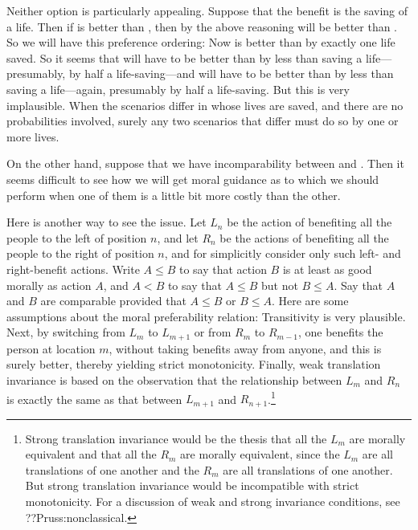 Neither option is particularly appealing. Suppose that the benefit is the saving of a life. Then if
 is better than , then by the above reasoning 
will be better than . So we will have this preference ordering:
Now  is better than  by exactly one life saved. So it seems that
 will have to be better than  by less than saving a life---presumably,
by half a life-saving---and  will have to be better than  by less than saving 
a life---again, presumably by half a life-saving. But this is very implausible. When the scenarios differ in 
whose lives are saved, and there are no probabilities involved, surely any two scenarios that differ must do 
so by one or more lives. 

On the other hand, suppose that we have incomparability between  and .
Then it seems difficult to see how we will get moral guidance as to which we should perform when one of them
is a little bit more costly than the other. 

Here is another way to see the issue. Let $L_n$ be the action of benefiting all the people to the left of 
position $n$, and let $R_n$ be the actions of benefiting all the people to the right of position $n$, and 
for simplicitly consider only such left- and right-benefit actions. Write $A\le B$ to say that action $B$ 
is at least as good morally as action $A$, and $A<B$ to say that $A\le B$ but not $B\le A$. Say that $A$ and 
$B$ are comparable provided that $A\le B$ or $B\le A$. Here are some assumptions about the 
moral preferability relation:
Transitivity is very plausible. Next, by switching from $L_m$ to $L_{m+1}$ or from $R_m$ to $R_{m-1}$, 
one benefits the person at location $m$, without taking benefits away from anyone, and this is surely 
better, thereby yielding strict monotonicity. Finally, weak translation invariance is based on the observation 
that the relationship between $L_m$ and $R_n$ is exactly the same as that between $L_{m+1}$ and $R_{n+1}$.\footnote{Strong
translation invariance would be the thesis that all the $L_m$ are morally equivalent and that all the $R_m$ are 
morally equivalent, since the $L_m$ are all translations of one another and the $R_m$ are all translations of 
one another. But strong translation invariance would be incompatible with strict monotonicity. For a discussion 
of weak and strong invariance conditions, see ??Pruss:nonclassical.}

